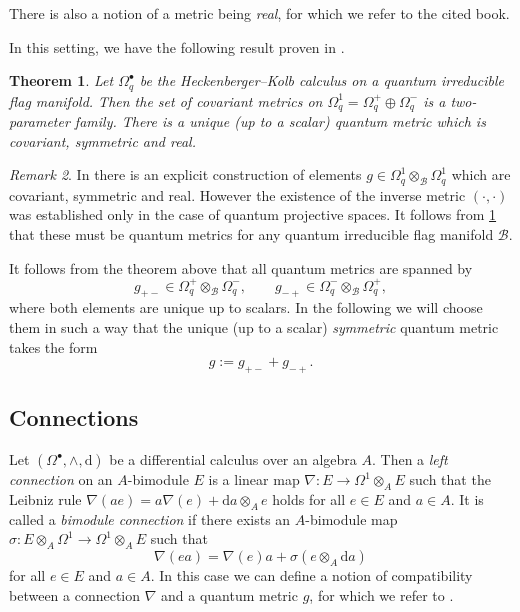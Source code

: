 \documentclass[a4paper,12pt,reqno,english]{amsart}
\numberwithin{equation}{section}
\numberwithin{figure}{section}
\theoremstyle{plain}
\newtheorem{theorem}{Theorem}[section]
\theoremstyle{plain}
\theoremstyle{plain}
\theoremstyle{plain}
\theoremstyle{plain}
\theoremstyle{definition}
\theoremstyle{definition}
\theoremstyle{definition}
\theoremstyle{remark}
\newtheorem{remark}[theorem]{Remark}
\theoremstyle{definition}
\newcommand{\qalg}{\mathcal{B}}
\newcommand{\diff}{\mathrm{d}}
\newcommand{\diffcalc}{\Omega_q}
\begin{document}
There is also a notion of a metric being \emph{real}, for which we refer to the cited book.

In this setting, we have the following result proven in \cite[Theorem 6.12]{levicivita-irreducible}.

\begin{theorem}
\label{thm:covariant-metrics}
Let $\diffcalc^\bullet$ be the Heckenberger--Kolb calculus on a quantum irreducible flag manifold.
Then the set of covariant metrics on $\diffcalc^1 = \diffcalc^+ \oplus \diffcalc^-$ is a two-parameter family.
There is a unique (up to a scalar) quantum metric which is covariant, symmetric and real.
\end{theorem}

\begin{remark}
In \cite{matassa-fubini} there is an explicit construction of elements $g \in \diffcalc^1 \otimes_\qalg \diffcalc^1$ which are covariant, symmetric and real.
However the existence of the inverse metric $(\cdot, \cdot)$ was established only in the case of quantum projective spaces.
It follows from \cref{thm:covariant-metrics} that these must be quantum metrics for any quantum irreducible flag manifold $\qalg$.
\end{remark}

It follows from the theorem above that all quantum metrics are spanned by
\[
g_{+ -} \in \diffcalc^+ \otimes_\qalg \diffcalc^-, \qquad
g_{- +} \in \diffcalc^- \otimes_\qalg \diffcalc^+,
\]
where both elements are unique up to scalars.
In the following we will choose them in such a way that the unique (up to a scalar) \emph{symmetric} quantum metric takes the form
\[
g := g_{+ -} + g_{- +}.
\]

\subsection{Connections}

Let $(\Omega^\bullet, \wedge, \diff)$ be a differential calculus over an algebra $A$.
Then a \emph{left connection} on an $A$-bimodule $E$ is a linear map $\nabla: E \to \Omega^1 \otimes_A E$ such that the Leibniz rule $\nabla(a e) = a \nabla(e) + \diff a \otimes_A e$ holds for all $e \in E$ and $a \in A$.
It is called a \emph{bimodule connection} if there exists an $A$-bimodule map $\sigma: E \otimes_A \Omega^1 \to \Omega^1 \otimes_A E$ such that
\[
\nabla(e a) = \nabla(e) a + \sigma(e \otimes_A \diff a)
\]
for all $e \in E$ and $a \in A$.
In this case we can define a notion of compatibility between a connection $\nabla$ and a quantum metric $g$, for which we refer to \cite[Section 8.1]{quantum-book}.
\end{document}

